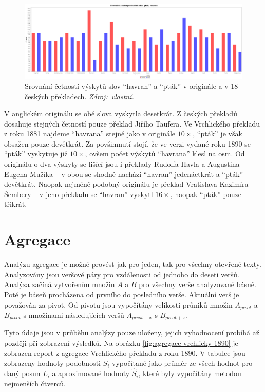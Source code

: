 \documentclass[dp.tex]{subfiles}
\begin{document}
\begin{figure}[h!]
	\centering
	\includegraphics[max width=\textwidth,keepaspectratio=true]{imgs-70-prakticka/cetnost-slov-orig}
	\caption[Srovnání četností výskytů slov \enquote{havran} a \enquote{pták} v originále a v 18 českých překladech.]{Srovnání četností výskytů slov \enquote{havran} a \enquote{pták} v originále a v 18 českých překladech. \textit{Zdroj:~vlastní.}}
	\label{fig:word-freq-compare}
\end{figure}

V anglickém originálu se obě slova vyskytla desetkrát. Z českých překladů dosahuje stejných četností pouze překlad Jiřího Taufera. Ve Vrchlického překladu z roku 1881 najdeme \enquote{havrana} stejně jako v originále $10\times$, \enquote{pták} je však obsažen pouze devětkrát. Za povšimnutí stojí, že ve verzi vydané roku 1890 se \enquote{pták} vyskytuje již $10\times$, ovšem počet výskytů \enquote{havrana} klesl na osm. Od originálu o dva výskyty se lišící jsou i překlady Rudolfa Havla a Augustina Eugena Mužíka -- v obou se shodně nachází \enquote{havran} jedenáctkrát a \enquote{pták} devětkrát. Naopak nejméně podobný originálu je překlad Vratislava Kazimíra Šembery -- v jeho překladu se \enquote{havran} vyskytl $16\times$, naopak \enquote{pták} pouze třikrát.

\section{Agregace}

Analýzu agregace je možné provést jak pro jeden, tak pro všechny otevřené texty. Analyzovány jsou veršové páry pro vzdálenosti od jednoho do deseti veršů. Analýza začíná vytvořením množin $A$ a $B$ pro všechny verše analyzované básně. Poté je báseň procházena od prvního do posledního verše. Aktuální verš je považován za pivot. Od pivotu jsou vypočítány velikosti průniků množin $A_{pivot}$ a $B_{pivot}$ s množinami následujících veršů $A_{pivot + x}$  s $B_{pivot + x}$. 

Tyto údaje jsou v průběhu analýzy pouze uloženy, jejich vyhodnocení probíhá až později při zobrazení výsledků. Na obrázku \ref{fig:agregace-vrchlicky-1890} je zobrazen report z agregace Vrchlického překladu z roku 1890. V tabulce jsou zobrazeny hodnoty podobnosti $\overline{S}_i$ vypočítané jako průměr ze všech hodnot pro daný posun $L_i$ a aproximované hodnoty $\hat{S}_i$, které byly vypočítány metodou nejmenších čtverců.
\end{document}
